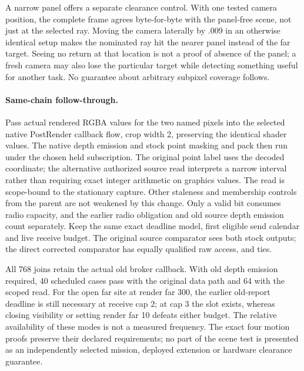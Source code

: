 \documentclass{article}
\begin{document}
A narrow panel offers a separate clearance control. With one
tested camera position, the complete frame agrees byte-for-byte
with the panel-free scene, not just at the selected ray. Moving
the camera laterally by .009 in an otherwise identical setup
makes the nominated ray hit the nearer panel instead of the
far target. Seeing no return at that location is not a proof
of absence of the panel; a fresh camera may also lose the
particular target while detecting something useful for another task.
No guarantee about arbitrary subpixel coverage follows.

\paragraph{Same-chain follow-through.}
Pass actual rendered RGBA values for the two named pixels into
the selected native PostRender callback flow, crop width 2, preserving
the identical shader values. The native depth emission and stock
point masking and pack then run under the chosen held subscription.
The original point label uses the decoded coordinate; the alternative
authorized source read interprets a narrow interval rather than
requiring exact integer arithmetic on graphics values. The read is
scope-bound to the stationary capture. Other staleness and membership
controls from the parent are not weakened by this change.
Only a valid bit consumes radio capacity, and the earlier radio
obligation and old source depth emission count separately.
Keep the same exact deadline model, first eligible send calendar and
live receive budget. The original source comparator sees both stock
outputs; the direct corrected comparator has equally qualified raw
access, and ties.

All 768 joins retain the actual old broker callback. With old depth
emission required, 40 scheduled cases pass with the original data path
and 64 with the scoped read. For the open far site at render far 300,
the earlier old-report deadline is still necessary at receive cap 2;
at cap 3 the slot exists, whereas closing visibility or setting render
far 10 defeats either budget. The relative availability of these modes
is not a measured frequency. The exact four motion proofs preserve
their declared requirements; no part of the scene test is presented
as an independently selected mission, deployed extension or hardware
clearance guarantee.
\end{document}
